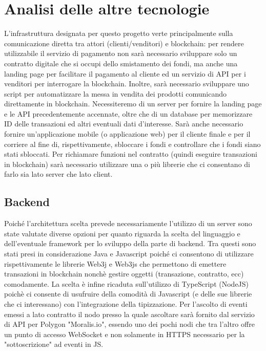 \documentclass[a4paper, 12pt]{article}
\begin{document}
\section{Analisi delle altre tecnologie}
L'infrastruttura designata per questo progetto verte principalmente sulla comunicazione diretta tra attori (clienti/venditori) e blockchain: per rendere utilizzabile il servizio di pagamento non sarà necessario sviluppare solo un contratto digitale che si occupi dello smistamento dei fondi, ma anche una landing page per facilitare il pagamento al cliente ed un servizio di API per i venditori per interrogare la blockchain.
Inoltre, sarà necessario sviluppare uno script per automatizzare la messa in vendita dei prodotti comunicando direttamente in blockchain.
Necessiteremo di un server per fornire la landing page e le API precedentemente accennate, oltre che di un database per memorizzare ID delle transazioni ed altri eventuali dati d'interesse.
Sarà anche necessario fornire un'applicazione mobile (o applicazione web) per il cliente finale e per il corriere al fine di, rispettivamente, sbloccare i fondi e controllare che i fondi siano stati sbloccati.
Per richiamare funzioni nel contratto (quindi eseguire transazioni in blockchain) sarà necessario utilizzare una o più librerie che ci consentano di farlo sia lato server che lato client.

\subsection*{Backend}
Poiché l'architettura scelta prevede necessariamente l'utilizzo di un server sono state valutate diverse opzioni per quanto riguarda la scelta del linguaggio e dell'eventuale framework per lo sviluppo della parte di backend. Tra questi sono stati presi in considerazione Java e Javascript poiché ci consentono di utilizzare rispettivamente le librerie Web3j e Web3js che permettono di emettere transazioni in blockchain nonchè gestire oggetti (transazione, contratto, ecc) comodamente. La scelta è infine ricaduta sull'utilizzo di TypeScript (NodeJS) poichè ci consente di usufruire della comodità di Javascript (e delle sue librerie che ci interessano) con l'integrazione della tipizzazione. Per l'ascolto di eventi emessi a lato contratto il nodo presso la quale ascoltare sarà fornito dal servizio di API per Polygon "Moralis.io", essendo uno dei pochi nodi che tra l'altro offre un punto di accesso WebSocket e non solamente in HTTPS necessario per la "sottoscrizione" ad eventi in JS.
\end{document}
